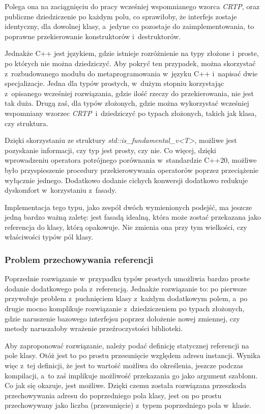 \documentclass[12pt]{article}
\newcommand{\n}{\newline}
\newcommand{\nonpl}[1]{{\it #1}}
\newcommand{\code}[1]{{\it #1}}
\newcommand{\CRTP}{\nonpl{CRTP}}
\begin{document}
{{{				Polega ona na zaciągnięciu do pracy wcześniej wspomnianego wzorca \CRTP, oraz publiczne dziedziczenie po każdym polu, co sprawiłoby, że
				interfejs zostaje identyczny, dla dowolnej klasy, a~jedyne co pozostaje do zaimplementowania, to poprawne przekierowanie konstruktorów
				i~destruktorów.\n

				Jednakże C++ jest językiem, gdzie istnieje rozróżnienie na typy złożone i~proste, po których nie można dziedziczyć. Aby pokryć ten przypadek,
				można skorzystać z~rozbudowanego modułu do metaprogramowania w~języku C++ i~napisać dwie specjalizacje. Jedna dla typów prostych, w~dużym stopniu
				korzystając z~opisanego wcześniej rozwiązania, gdzie ilość rzeczy do przekierowania, nie jest tak duża. Drugą zaś, dla typów złożonych,
				gdzie można wykorzystać wcześniej wspomniany wzorzec \CRTP~i~dziedziczyć po typach złożonych, takich jak klasa, czy struktura.\n

				Dzięki skorzystaniu ze struktury \code{std::is\_fundamental\_v<T>}\cite{std_is_fundamental}, możliwe jest pozyskanie informacji,
				czy typ jest prosty, czy nie. Co więcej, dzięki wprowadzeniu operatora potrójnego porównania \cite{starship_operator} w~standardzie C++20, możliwe było
				przyspieszenie procedury przekierowywania operatorów poprzez przeciążenie wyłącznie jednego. Dodatkowo dodanie cichych konwersji dodatkowo redukuje
				dyskomfort w~korzystaniu z~fasady.\n

				Implementacja tego typu, jako zespół dwóch wymienionych podejść, ma jeszcze jedną bardzo ważną zaletę: jest fasadą idealną, która może zostać przekazana
				jako referencja do klasy, którą opakowuje. Nie zmienia ona przy tym wielkości, czy właściwości typów pól klasy.
			}

			{
				\subsubsection{Problem przechowywania referencji}

				Poprzednie rozwiązanie w~przypadku typów prostych umożliwia bardzo proste dodanie dodatkowego pola z~referencją. Jednakże rozwiązanie to:
				po pierwsze przywołuje problem z~puchnięciem klasy z~każdym dodatkowym polem, a~po drugie mocno komplikuje rozwiązanie z~dziedziczeniem po
				typach złożonych, gdzie naruszenie bazowego interfejsu poprzez dołożenie nowej zmiennej, czy metody naruszałoby wrażenie przeźroczystości
				biblioteki.\n

				Aby zaproponować rozwiązanie, należy podać definicję statycznej referencji na pole klasy. Otóż jest to po prostu przesunięcie względem
				adresu instancji. Wynika więc z~tej definicji, że jest to wartość możliwa do określenia, jeszcze podczas kompilacji,
				a~to zaś implikuje możliwość przekazania go jako argument szablonu. Co jak się okazuje, jest możliwe. Dzięki czemu została rozwiązana przeszkoda
				przechowywania adresu do poprzedniego pola klasy, jest on po prostu przechowywany jako liczba (przesunięcie) z~typem poprzedniego pola w~klasie.\n

}}}
\end{document}
